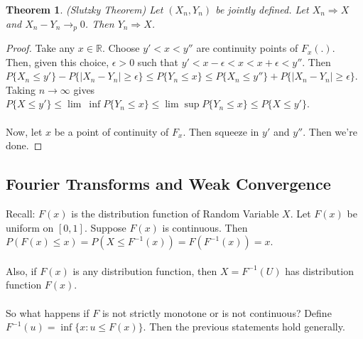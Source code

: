 \documentclass[12pt]{article}
\newtheorem{theorem}{Theorem}
\begin{document}
\begin{theorem}
(Slutzky Theorem) Let $(X_n, Y_n)$ be jointly defined.  Let $X_n \Rightarrow X$ and $X_n - Y_n \to_p 0$.  Then $Y_n \Rightarrow X$.
\end{theorem}
\begin{proof}
Take any $x \in \mathbb{R}$.  Choose $y' < x < y''$ are continuity points of $F_x(.)$.  Then, given this choice, $\epsilon > 0$ such that $y' < x - \epsilon < x < x + \epsilon < y''$.  Then $P \{ X_n \le y'  \} - P \{ |X_n - Y_n| \ge \epsilon \} \le P \{ Y_n \le x \} \le P \{ X_n \le y'' \} + P \{ |X_n - Y_n | \ge \epsilon \}$.  Taking $n \to \infty$ gives $P \{X \le y' \} \le \lim\ \inf P \{ Y_n \le x \} \le \lim \sup P \{Y_n \le x \} \le P \{X \le y' \}$.
\\ \\
Now, let $x$ be a point of continuity of $F_x$.  Then squeeze in $y'$ and $y''$.  Then we're done.
\end{proof}

\subsection{Fourier Transforms and Weak Convergence}
Recall: $F(x)$ is the distribution function of Random Variable $X$.  Let $F(x)$ be uniform on $[0,1]$.  Suppose $F(x)$ is continuous.  Then $P(F(x) \le x) = P(X \le F^{-1}(x)) = F(F^{-1}(x)) = x$.
\\ \\
Also, if $F(x)$ is any distribution function, then $X = F^{-1}(U)$ has distribution function $F(x)$.
\\ \\
So what happens if $F$ is not strictly monotone or is not continuous?  Define $F^{-1}(u) = \inf \{ x : u \le F(x) \}$.  Then the previous statements hold generally.
\end{document}
